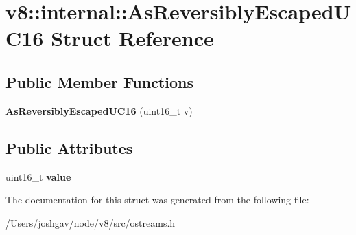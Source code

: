 \hypertarget{structv8_1_1internal_1_1_as_reversibly_escaped_u_c16}{}\section{v8\+:\+:internal\+:\+:As\+Reversibly\+Escaped\+U\+C16 Struct Reference}
\label{structv8_1_1internal_1_1_as_reversibly_escaped_u_c16}
\subsection*{Public Member Functions}
\begin{DoxyCompactItemize}
\item 
{\bfseries As\+Reversibly\+Escaped\+U\+C16} (uint16\+\_\+t v)\hypertarget{structv8_1_1internal_1_1_as_reversibly_escaped_u_c16_ac717767d695ca1c9a5a583d9dbc679d0}{}\label{structv8_1_1internal_1_1_as_reversibly_escaped_u_c16_ac717767d695ca1c9a5a583d9dbc679d0}

\end{DoxyCompactItemize}
\subsection*{Public Attributes}
\begin{DoxyCompactItemize}
\item 
uint16\+\_\+t {\bfseries value}\hypertarget{structv8_1_1internal_1_1_as_reversibly_escaped_u_c16_a60d74ea24e39df7e99a6b9cb00b71e0b}{}\label{structv8_1_1internal_1_1_as_reversibly_escaped_u_c16_a60d74ea24e39df7e99a6b9cb00b71e0b}

\end{DoxyCompactItemize}


The documentation for this struct was generated from the following file\+:\begin{DoxyCompactItemize}
\item 
/\+Users/joshgav/node/v8/src/ostreams.\+h\end{DoxyCompactItemize}
